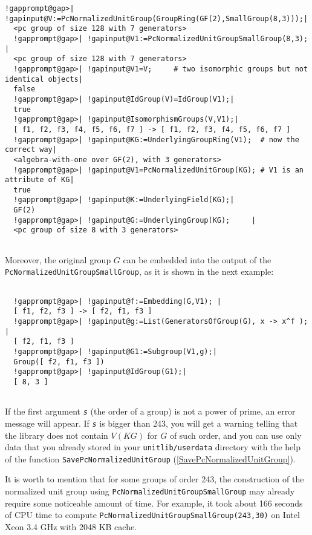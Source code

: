 \documentclass[a4paper,11pt]{report}
\begin{document}
{{\begin{Verbatim}[commandchars=!@|,fontsize=\small,frame=single,label=Example]
  !gapprompt@gap>| !gapinput@V:=PcNormalizedUnitGroup(GroupRing(GF(2),SmallGroup(8,3)));|
  <pc group of size 128 with 7 generators>
  !gapprompt@gap>| !gapinput@V1:=PcNormalizedUnitGroupSmallGroup(8,3);                   |
  <pc group of size 128 with 7 generators>
  !gapprompt@gap>| !gapinput@V1=V;     # two isomorphic groups but not identical objects|
  false
  !gapprompt@gap>| !gapinput@IdGroup(V)=IdGroup(V1);|
  true
  !gapprompt@gap>| !gapinput@IsomorphismGroups(V,V1);|
  [ f1, f2, f3, f4, f5, f6, f7 ] -> [ f1, f2, f3, f4, f5, f6, f7 ]
  !gapprompt@gap>| !gapinput@KG:=UnderlyingGroupRing(V1);  # now the correct way|
  <algebra-with-one over GF(2), with 3 generators>
  !gapprompt@gap>| !gapinput@V1=PcNormalizedUnitGroup(KG); # V1 is an attribute of KG|
  true
  !gapprompt@gap>| !gapinput@K:=UnderlyingField(KG);|
  GF(2)
  !gapprompt@gap>| !gapinput@G:=UnderlyingGroup(KG);     |
  <pc group of size 8 with 3 generators>
  
\end{Verbatim}
 Moreover, the original group $G$ can be embedded into the output of the \texttt{PcNormalizedUnitGroupSmallGroup}, as it is shown in the next example: \newpage 
\begin{Verbatim}[commandchars=!@|,fontsize=\small,frame=single,label=Example]
  
  !gapprompt@gap>| !gapinput@f:=Embedding(G,V1); |
  [ f1, f2, f3 ] -> [ f2, f1, f3 ]
  !gapprompt@gap>| !gapinput@g:=List(GeneratorsOfGroup(G), x -> x^f ); |
  [ f2, f1, f3 ]
  !gapprompt@gap>| !gapinput@G1:=Subgroup(V1,g);|
  Group([ f2, f1, f3 ])
  !gapprompt@gap>| !gapinput@IdGroup(G1);|
  [ 8, 3 ]
  
\end{Verbatim}
 If the first argument \mbox{\texttt{\mdseries\slshape s}} (the order of a group) is not a power of prime, an error message will appear.
If \mbox{\texttt{\mdseries\slshape s}} is bigger than 243, you will get a warning telling that the library does not
contain $V(KG)$ for $G$ of such order, and you can use only data that you already stored in your \texttt{unitlib/userdata} directory with the help of the function \texttt{SavePcNormalizedUnitGroup} (\ref{SavePcNormalizedUnitGroup}). 

 It is worth to mention that for some groups of order 243, the construction of
the normalized unit group using \texttt{PcNormalizedUnitGroupSmallGroup} may already require some noticeable amount of time. For example, it took about
166 seconds of CPU time to compute \texttt{PcNormalizedUnitGroupSmallGroup(243,30)} on Intel Xeon 3.4 GHz with 2048 KB cache. 

}}
\end{document}
